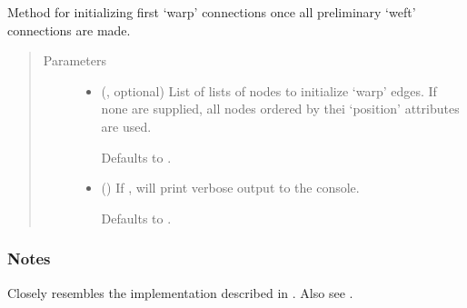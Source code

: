 \documentclass[letterpaper,10pt,english]{sphinxmanual}
\begin{document}
\begin{fulllineitems}
\begin{fulllineitems}
\end{fulllineitems}


\begin{fulllineitems}
\label{\detokenize{cockatoo:cockatoo.KnitNetwork.initialize_warp_edges}}
Method for initializing first ‘warp’ connections once all preliminary
‘weft’ connections are made.
\begin{quote}\begin{description}
\item[{Parameters}] \leavevmode\begin{itemize}
\item {} 
 (, optional) \textendash{} 
List of lists of nodes to initialize ‘warp’ edges. If none are
supplied, all nodes ordered by thei ‘position’ attributes are
used.

Defaults to .


\item {} 
 (\sphinxstyleliteralemphasis{\sphinxupquote{, }}) \textendash{} 
If , will print verbose output to the console.

Defaults to .


\end{itemize}

\end{description}\end{quote}
\subsubsection*{Notes}

Closely resembles the implementation described in  \sphinxfootnotemark[1]. Also see
 \sphinxfootnotemark[2].


\end{fulllineitems}
\end{fulllineitems}
\end{document}
